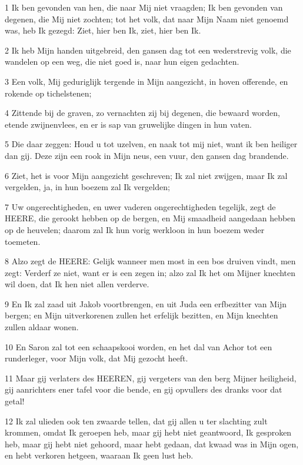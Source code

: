\par 1 Ik ben gevonden van hen, die naar Mij niet vraagden; Ik ben gevonden van degenen, die Mij niet zochten; tot het volk, dat naar Mijn Naam niet genoemd was, heb Ik gezegd: Ziet, hier ben Ik, ziet, hier ben Ik.
\par 2 Ik heb Mijn handen uitgebreid, den gansen dag tot een wederstrevig volk, die wandelen op een weg, die niet goed is, naar hun eigen gedachten.
\par 3 Een volk, Mij geduriglijk tergende in Mijn aangezicht, in hoven offerende, en rokende op tichelstenen;
\par 4 Zittende bij de graven, zo vernachten zij bij degenen, die bewaard worden, etende zwijnenvlees, en er is sap van gruwelijke dingen in hun vaten.
\par 5 Die daar zeggen: Houd u tot uzelven, en naak tot mij niet, want ik ben heiliger dan gij. Deze zijn een rook in Mijn neus, een vuur, den gansen dag brandende.
\par 6 Ziet, het is voor Mijn aangezicht geschreven; Ik zal niet zwijgen, maar Ik zal vergelden, ja, in hun boezem zal Ik vergelden;
\par 7 Uw ongerechtigheden, en uwer vaderen ongerechtigheden tegelijk, zegt de HEERE, die gerookt hebben op de bergen, en Mij smaadheid aangedaan hebben op de heuvelen; daarom zal Ik hun vorig werkloon in hun boezem weder toemeten.
\par 8 Alzo zegt de HEERE: Gelijk wanneer men most in een bos druiven vindt, men zegt: Verderf ze niet, want er is een zegen in; alzo zal Ik het om Mijner knechten wil doen, dat Ik hen niet allen verderve.
\par 9 En Ik zal zaad uit Jakob voortbrengen, en uit Juda een erfbezitter van Mijn bergen; en Mijn uitverkorenen zullen het erfelijk bezitten, en Mijn knechten zullen aldaar wonen.
\par 10 En Saron zal tot een schaapskooi worden, en het dal van Achor tot een runderleger, voor Mijn volk, dat Mij gezocht heeft.
\par 11 Maar gij verlaters des HEEREN, gij vergeters van den berg Mijner heiligheid, gij aanrichters ener tafel voor die bende, en gij opvullers des dranks voor dat getal!
\par 12 Ik zal ulieden ook ten zwaarde tellen, dat gij allen u ter slachting zult krommen, omdat Ik geroepen heb, maar gij hebt niet geantwoord, Ik gesproken heb, maar gij hebt niet gehoord, maar hebt gedaan, dat kwaad was in Mijn ogen, en hebt verkoren hetgeen, waaraan Ik geen lust heb.
